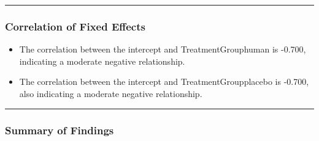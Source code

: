 \documentclass[
]{article}
\providecommand{\tightlist}{%
  \setlength{\itemsep}{0pt}\setlength{\parskip}{0pt}}
\begin{document}
\begin{center}\rule{0.5\linewidth}{0.5pt}\end{center}

\subsubsection{\texorpdfstring{\textbf{Correlation of Fixed
Effects}}{Correlation of Fixed Effects}}\label{correlation-of-fixed-effects-4}

\begin{itemize}
\tightlist
\item
  The correlation between the intercept and TreatmentGrouphuman is
  -0.700, indicating a moderate negative relationship.
\item
  The correlation between the intercept and TreatmentGroupplacebo is
  -0.700, also indicating a moderate negative relationship.
\end{itemize}

\begin{center}\rule{0.5\linewidth}{0.5pt}\end{center}

\subsubsection{\texorpdfstring{\textbf{Summary of
Findings}}{Summary of Findings}}\label{summary-of-findings-5}
\end{document}
